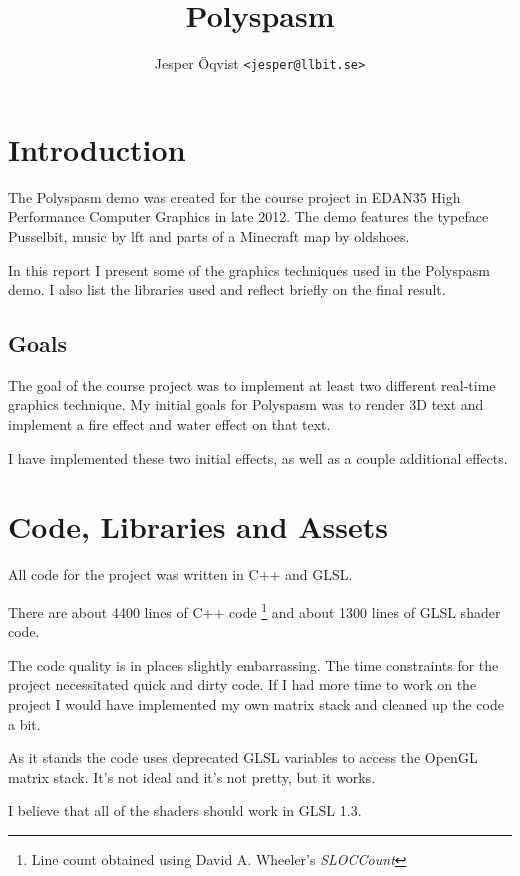 \documentclass{acmsiggraph}               %
\title{Polyspasm}
\author{Jesper Öqvist \texttt{<jesper@llbit.se>}}
\affiliation{Lund University\\ Sweden}
\begin{document}


\maketitle

\section{Introduction}

The Polyspasm demo was created for the course project in EDAN35 High
Performance Computer Graphics in late 2012.  The demo features the typeface
Pusselbit, music by lft and parts of a Minecraft map by oldshoes.

In this report I present some of the graphics techniques used in the Polyspasm
demo.  I also list the libraries used and reflect briefly on the final result.

\subsection{Goals}

The goal of the course project was to implement at least two different
real-time graphics technique. My initial goals for Polyspasm was to render 3D
text and implement a fire effect and water effect on that text.

I have implemented these two initial effects, as well as a couple additional
effects.

\section{Code, Libraries and Assets}

All code for the project was written in C++ and GLSL.

There are about 4400 lines of C++ code \footnote{Line count obtained using
David A. Wheeler's \emph{SLOCCount}} and about 1300 lines of GLSL shader code.

The code quality is in places slightly embarrassing. The time constraints for
the project necessitated quick and dirty code. If I had more time to work on
the project I would have implemented my own matrix stack and cleaned up the
code a bit.

As it stands the code uses deprecated GLSL variables to access the OpenGL
matrix stack. It's not ideal and it's not pretty, but it works.

I believe that all of the shaders should work in GLSL 1.3.
\end{document}
